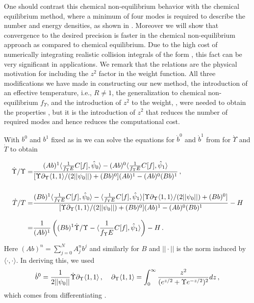 One should contrast this chemical non-equilibrium behavior  with the chemical equilibrium method, where a minimum of four modes is required to describe the number and energy densities, as shown in .   Moreover we will show that convergence to the desired precision is faster in the chemical non-equilibrium approach as compared to chemical equilibrium. Due to the high cost of numerically integrating realistic collision integrals of the form , this fact can be very significant in applications. We remark that the relations  are the physical motivation for including the $z^2$ factor in the weight function. All three modifications we have made in constructing our new method, the introduction of an effective temperature, i.e., $R\ne 1$, the generalization to chemical non-equilibrium $f_\Upsilon $, and the introduction of $z^2$ to the weight, , were needed to obtain the properties , but it is the introduction of $z^2$ that reduces the number of required modes and hence reduces the computational cost. 

With $b^0$ and $b^1$ fixed as in  we can solve the equations for $\dot b^0$ and $\dot b^1$ from  for $\dot\Upsilon$ and $\dot T$ to obtain

\begin{align}\label{Ups_T_eqs}
\dot{\Upsilon}/{\Upsilon}=&\frac{(Ab)^1\langle\frac{1}{f_\Upsilon E}C[f],\hat\psi_0\rangle-(Ab)^0\langle\frac{1}{f_\Upsilon E}C[f],\hat\psi_1\rangle }{[\Upsilon\partial_\Upsilon \langle1,1\rangle/(2||\psi_0||)+(Bb)^0](Ab)^1-(Ab)^0(Bb)^1}\,,\\[0.5cm]
\dot{T}/T
=&\frac{(Bb)^1\langle\frac{1}{f_\Upsilon E}C[f],\hat\psi_0\rangle-\langle\frac{1}{f_\Upsilon E}C[f],\hat\psi_1\rangle[\Upsilon\partial_\Upsilon \langle1,1\rangle/(2||\psi_0||)+(Bb)^0]}{[\Upsilon\partial_\Upsilon \langle1,1\rangle/(2||\psi_0||)+(Bb)^0](Ab)^1-(Ab)^0(Bb)^1}-H\notag\\[0.3cm]
=&\frac{1}{(Ab)^1}\left((Bb)^1\dot{\Upsilon}/\Upsilon-\langle\frac{1}{f_\Upsilon E}C[f],\hat\psi_1\rangle\right)-H\,.\label{T_eq}
\end{align}

Here $(Ab)^n=\sum_{j=0}^NA^n_jb^j$ and similarly for $B$ and $||\cdot||$ is the norm induced by $\langle\cdot,\cdot\rangle$. In deriving this, we used
\begin{equation}
\dot{b}^0=\frac{1}{2||\psi_0||}\dot\Upsilon\partial_\Upsilon \langle1,1\rangle\,, \hspace{4mm} \partial_\Upsilon \langle1,1\rangle=\int_0^\infty \frac{z^2}{(e^{z/2}+ \Upsilon e^{-z/2})^2}dz\,,
\end{equation}
which comes from differentiating . 
 
